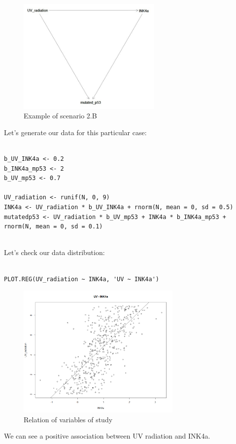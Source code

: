 \documentclass{article}
\begin{document}
\begin{figure}[h]
\caption{Example of scenario 2.B}
\includegraphics[width=7cm]{DAG_UV_INK_P53.png}
\centering
\end{figure}

Let's generate our data for this particular case:\par

\begin{lstlisting}

b_UV_INK4a <- 0.2
b_INK4a_mp53 <- 2
b_UV_mp53 <- 0.7

UV_radiation <- runif(N, 0, 9)
INK4a <- UV_radiation * b_UV_INK4a + rnorm(N, mean = 0, sd = 0.5)
mutatedp53 <- UV_radiation * b_UV_mp53 + INK4a * b_INK4a_mp53 + rnorm(N, mean = 0, sd = 0.1)
  
\end{lstlisting}

Let's check our data distribution: \par

\begin{lstlisting}

PLOT.REG(UV_radiation ~ INK4a, 'UV ~ INK4a')

\end{lstlisting}

\begin{figure}[h]
\caption{Relation of variables of study}
\includegraphics[width=8cm]{PLOT_UV_INK4A.png}
\centering
\end{figure}
We can see a positive association between UV radiation and INK4a.\par
\end{document}
